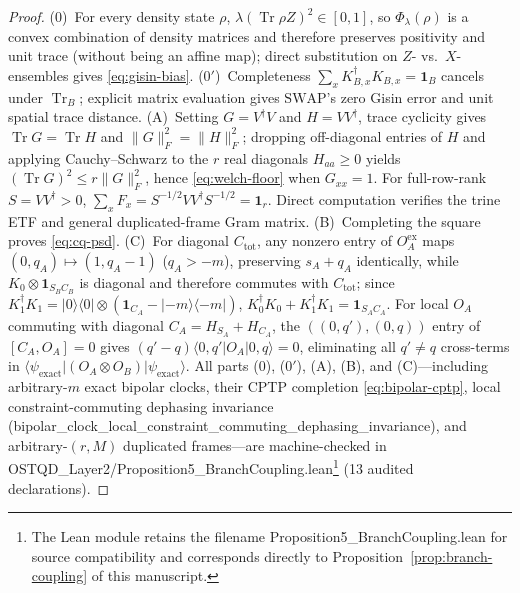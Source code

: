 \documentclass[11pt,a4paper]{article}
\theoremstyle{definition}
\theoremstyle{remark}
\newcommand{\Tr}{\operatorname{Tr}}
\newcommand{\1}{\mathbf{1}}
\newcommand{\normF}[1]{\|#1\|_F}
\newcommand{\code}[1]{{\scriptsize\ttfamily #1}}
\begin{document}
\begin{proof}
(0)~For every density state $\rho$, $\lambda(\Tr\rho Z)^2\in[0,1]$, so $\Phi_\lambda(\rho)$ is a convex combination of density matrices and therefore preserves positivity and unit trace (without being an affine map); direct substitution on $Z$- vs.\ $X$-ensembles gives \eqref{eq:gisin-bias}.
(0$'$)~Completeness $\sum_x K_{B,x}^\dagger K_{B,x}=\1_B$ cancels under $\Tr_B$; explicit matrix evaluation gives $\mathrm{SWAP}$'s zero Gisin error and unit spatial trace distance.
(A)~Setting $G=V^\dagger V$ and $H=V V^\dagger$, trace cyclicity gives $\Tr G=\Tr H$ and $\normF{G}^2=\normF{H}^2$; dropping off-diagonal entries of $H$ and applying Cauchy--Schwarz to the $r$ real diagonals $H_{aa}\ge 0$ yields $(\Tr G)^2\le r\normF{G}^2$, hence \eqref{eq:welch-floor} when $G_{xx}=1$. For full-row-rank $S=VV^\dagger>0$, $\sum_x F_x = S^{-1/2}VV^\dagger S^{-1/2}=\1_r$. Direct computation verifies the trine ETF and general duplicated-frame Gram matrix.
(B)~Completing the square proves \eqref{eq:cq-psd}.
(C)~For diagonal $C_{\mathrm{tot}}$, any nonzero entry of $O_A^{\mathrm{ex}}$ maps $(0,q_A)\mapsto(1,q_A-1)$ ($q_A>-m$), preserving $s_A+q_A$ identically, while $K_0\otimes\1_{S_B C_B}$ is diagonal and therefore commutes with $C_{\mathrm{tot}}$; since $K_1^\dagger K_1=|0\rangle\langle 0|\otimes(\1_{C_A}-|-m\rangle\langle -m|)$, $K_0^\dagger K_0+K_1^\dagger K_1=\1_{S_A C_A}$. For local $O_A$ commuting with diagonal $C_A=H_{S_A}+H_{C_A}$, the $((0,q'),(0,q))$ entry of $[C_A,O_A]=0$ gives $(q'-q)\langle 0,q'|O_A|0,q\rangle=0$, eliminating all $q'\neq q$ cross-terms in $\langle\psi_{\mathrm{exact}}|(O_A\otimes O_B)|\psi_{\mathrm{exact}}\rangle$. All parts (0), (0$'$), (A), (B), and (C)---including arbitrary-$m$ exact bipolar clocks, their CPTP completion \eqref{eq:bipolar-cptp}, local constraint-commuting dephasing invariance (\code{bipolar\_\allowbreak clock\_\allowbreak local\_\allowbreak constraint\_\allowbreak commuting\_\allowbreak dephasing\_\allowbreak invariance}), and arbitrary-$(r,M)$ duplicated frames---are machine-checked in \code{OSTQD\_Layer2/\allowbreak Proposition5\_\allowbreak BranchCoupling.lean}\footnote{The Lean module retains the filename \code{Proposition5\_BranchCoupling.lean} for source compatibility and corresponds directly to Proposition~\ref{prop:branch-coupling} of this manuscript.} (13 audited declarations).
\end{proof}
\end{document}
